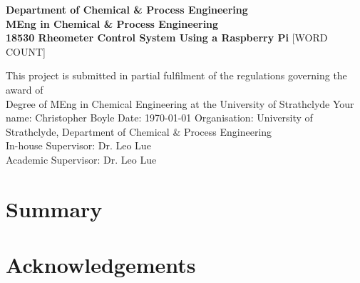 \documentclass{report}
\def\atitle{Rheometer Control System Using a Raspberry Pi}
\begin{document}
	\begin{titlepage}
		\centering
		\vfill
		{
			\bfseries\Large
			Department of Chemical \& Process Engineering\\
			\vskip1cm
			MEng in Chemical \& Process Engineering\\
			18530
			\vskip2cm
			\atitle
		}
		\vskip2cm
		[WORD COUNT]
		\vskip1cm
		\begin{flushleft}
			This project is submitted in partial fulfilment of the regulations governing the award of \\
			Degree of MEng in Chemical Engineering at the University of Strathclyde
			\vfill
			Your name: Christopher Boyle \hfill Date: \today
			\vskip1cm
			Organisation: University of Strathclyde, Department of Chemical \& Process Engineering\\
			In-house Supervisor: Dr. Leo Lue\\
			Academic Supervisor: Dr. Leo Lue\\
		\end{flushleft}
		\vfill
	\end{titlepage}
	
	
	
	\thispagestyle{plain}
	\section{Summary}
	
	\tableofcontents
	
	\newpage
	\section{Acknowledgements}
	
\end{document}
